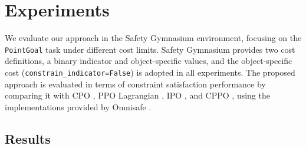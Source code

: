 \section{Experiments}

We evaluate our approach in the Safety Gymnasium \cite{ji2023safety} environment, focusing on the \texttt{PointGoal} task under different cost limits.
Safety Gymnasium provides two cost definitions, a binary indicator and object-specific values, and the object-specific cost (\texttt{constrain\_indicator=False}) is adopted in all experiments.
The proposed approach is evaluated in terms of constraint satisfaction performance by comparing it with CPO \cite{achiam2017constrained}, PPO Lagrangian \cite{ray2019benchmarking}, IPO \cite{liu2020ipo}, and CPPO \cite{stooke2020responsive}, using the implementations provided by Omnisafe \cite{ji2024omnisafe}.

\subsection{Results}

